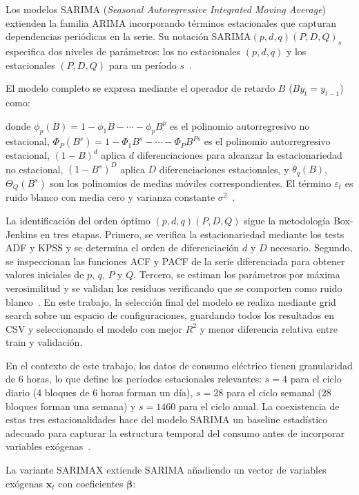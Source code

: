 \documentclass[12pt, a4paper]{article}
\begin{document}
Los modelos SARIMA (\textit{Seasonal Autoregressive Integrated Moving Average}) extienden la familia ARIMA incorporando términos estacionales que capturan dependencias periódicas en la serie. Su notación SARIMA$(p, d, q)(P, D, Q)_s$ especifica dos niveles de parámetros: los no estacionales $(p, d, q)$ y los estacionales $(P, D, Q)$ para un período $s$~\cite{hyndman2021, boxjenkins2015}.

El modelo completo se expresa mediante el operador de retardo $B$ ($B y_t = y_{t-1}$) como:

donde $\phi_p(B) = 1 - \phi_1 B - \cdots - \phi_p B^p$ es el polinomio autorregresivo no estacional, $\Phi_P(B^s) = 1 - \Phi_1 B^s - \cdots - \Phi_P B^{Ps}$ es el polinomio autorregresivo estacional, $(1-B)^d$ aplica $d$ diferenciaciones para alcanzar la estacionariedad no estacional, $(1-B^s)^D$ aplica $D$ diferenciaciones estacionales, y $\theta_q(B)$, $\Theta_Q(B^s)$ son los polinomios de medias móviles correspondientes. El término $\varepsilon_t$ es ruido blanco con media cero y varianza constante $\sigma^2$~\cite{hyndman2021}.

La identificación del orden óptimo $(p, d, q)(P, D, Q)$ sigue la metodología Box-Jenkins en tres etapas. Primero, se verifica la estacionariedad mediante los tests ADF y KPSS y se determina el orden de diferenciación $d$ y $D$ necesario. Segundo, se inspeccionan las funciones ACF y PACF de la serie diferenciada para obtener valores iniciales de $p$, $q$, $P$ y $Q$. Tercero, se estiman los parámetros por máxima verosimilitud y se validan los residuos verificando que se comporten como ruido blanco~\cite{hyndman2021, boxjenkins2015}. En este trabajo, la selección final del modelo se realiza mediante grid search sobre un espacio de configuraciones, guardando todos los resultados en CSV y seleccionando el modelo con mejor $R^2$ y menor diferencia relativa entre train y validación.

En el contexto de este trabajo, los datos de consumo eléctrico tienen granularidad de 6 horas, lo que define los períodos estacionales relevantes: $s = 4$ para el ciclo diario (4 bloques de 6 horas forman un día), $s = 28$ para el ciclo semanal (28 bloques forman una semana) y $s = 1460$ para el ciclo anual. La coexistencia de estas tres estacionalidades hace del modelo SARIMA un baseline estadístico adecuado para capturar la estructura temporal del consumo antes de incorporar variables exógenas~\cite{hyndman2021}.

La variante SARIMAX extiende SARIMA añadiendo un vector de variables exógenas $\mathbf{x}_t$ con coeficientes $\boldsymbol{\beta}$:
\end{document}
